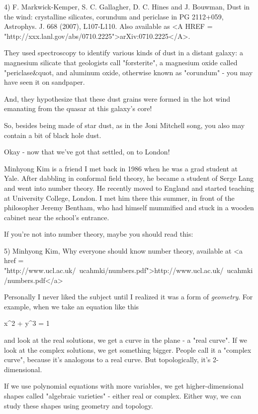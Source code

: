 4) F. Markwick-Kemper, S. C. Gallagher, D. C. Hines and J. Bouwman, 
Dust in the wind: crystalline silicates, corundum and periclase in 
PG 2112+059, Astrophys. J. 668 (2007), L107-L110. Also available
as <A HREF = "http://xxx.lanl.gov/abs/0710.2225">arXiv:0710.2225</A>.

They used spectroscopy to identify various kinds of dust in a distant
galaxy: a magnesium silicate that geologists call
"forsterite", a magnesium oxide called
"periclase&quot, and aluminum oxide, otherwise known as
"corundum" - you may have seen it on sandpaper.

And, they hypothesize that these dust grains were formed in the
hot wind emanating from the quasar at this galaxy's core!

So, besides being made of star dust, as in the Joni Mitchell
song, you also may contain a bit of black hole dust. 

Okay - now that we've got that settled, on to London!

Minhyong Kim is a friend I met back in 1986 when he was a grad 
student at Yale.  After dabbling in conformal field theory, he
became a student of Serge Lang and went into number theory.  He 
recently moved to England and started teaching at University 
College, London.  I met him there this summer, in front of the 
philosopher Jeremy Bentham, who had himself mummified and stuck
in a wooden cabinet near the school's entrance.

If you're not into number theory, maybe you should read this:

5) Minhyong Kim, Why everyone should know number theory,
available at <a href = "http://www.ucl.ac.uk/~ucahmki/numbers.pdf">http://www.ucl.ac.uk/~ucahmki/numbers.pdf</a>

Personally I never liked the subject until I realized it was
a form of \emph{geometry}.  For example, when we take an equation like
this

x^{2} + y^{3} = 1

and look at the real solutions, we get a curve in the plane - 
a "real curve".  If we look at the complex solutions, we get
something bigger.  People call it a "complex curve", because 
it's analogous to a real curve.  But topologically, it's 
2-dimensional.  

If we use polynomial equations with more variables, we get
higher-dimensional shapes called "algebraic varieties" -
either real or complex.  Either way, we can study these shapes using
geometry and topology.

